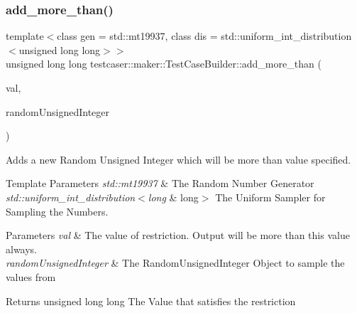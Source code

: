\subsubsection{\texorpdfstring{add\_more\_than()}{add\_more\_than()}\hspace{0.1cm}{\footnotesize\ttfamily [2/2]}}
{\footnotesize\ttfamily template$<$class gen  = std\+::mt19937, class dis  = std\+::uniform\+\_\+int\+\_\+distribution$<$unsigned long long$>$$>$ \\
unsigned long long testcaser\+::maker\+::\+Test\+Case\+Builder\+::add\+\_\+more\+\_\+than (\begin{DoxyParamCaption}\item[{unsigned long long}]{val,  }\item[{\mbox{\hyperlink{classtestcaser_1_1maker_1_1types_1_1RandomUnsignedInteger}{types\+::\+Random\+Unsigned\+Integer}}$<$ gen, dis $>$ \&}]{random\+Unsigned\+Integer }\end{DoxyParamCaption})\hspace{0.3cm}{\ttfamily [inline]}}



Adds a new Random Unsigned Integer which will be more than value specified. 


\begin{DoxyTemplParams}{Template Parameters}
{\em std\+::mt19937} & The Random Number Generator \\
\hline
{\em std\+::uniform\+\_\+int\+\_\+distribution$<$long} & long$>$ The Uniform Sampler for Sampling the Numbers. \\
\hline
\end{DoxyTemplParams}

\begin{DoxyParams}{Parameters}
{\em val} & The value of restriction. Output will be more than this value always. \\
\hline
{\em random\+Unsigned\+Integer} & The Random\+Unsigned\+Integer Object to sample the values from \\
\hline
\end{DoxyParams}
\begin{DoxyReturn}{Returns}
unsigned long long The Value that satisfies the restriction 
\end{DoxyReturn}
\mbox{\label{classtestcaser_1_1maker_1_1TestCaseBuilder_a5c23f3b3d3533c48477741da8337af98}} 
